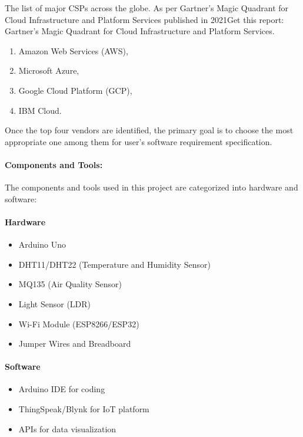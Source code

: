 \documentclass[12pt]{report}
\begin{document}
	The list of major CSPs across the globe. As per Gartner's Magic Quadrant for Cloud
	Infrastructure and Platform Services published in 2021{Get this report: Gartner's Magic Quadrant for Cloud Infrastructure and Platform Services}.\\
	
	\begin{enumerate}
		\item Amazon Web Services (AWS),
		\item Microsoft Azure,
		\item Google Cloud Platform (GCP),
		\item IBM Cloud.
	\end{enumerate}
	\vspace{0.2cm}	
	Once the top four vendors are identified, the primary goal is to choose the most appropriate
	one among them for user's software requirement specification.
	
	\paragraph*{Components and Tools:}
	The components and tools used in this project are categorized into hardware and software:
	
	\paragraph{Hardware}
	\begin{itemize}
		\item Arduino Uno
		\item DHT11/DHT22 (Temperature and Humidity Sensor)
		\item MQ135 (Air Quality Sensor)
		\item Light Sensor (LDR)
		\item Wi-Fi Module (ESP8266/ESP32)
		\item Jumper Wires and Breadboard
	\end{itemize}
	
	\paragraph{Software}
	\vspace{0.5cm}
	\begin{itemize}
		\item Arduino IDE for coding 
		\item ThingSpeak/Blynk for IoT platform 
		\item APIs for data visualization
	\end{itemize}
	
\end{document}
